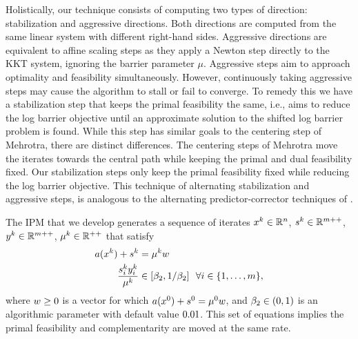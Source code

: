 \documentclass{article}
\begin{document}




Holistically, our technique consists of computing two types of direction: stabilization and aggressive directions. Both directions are computed from the same linear system with different right-hand sides. Aggressive directions are equivalent to affine scaling steps \cite{mehrotra1992implementation} as they apply a Newton step directly to the KKT system, ignoring the barrier parameter $\mu$. Aggressive steps aim to approach optimality and feasibility simultaneously. However, continuously taking aggressive steps may cause the algorithm to stall or fail to converge. To remedy this we have a stabilization step that keeps the primal feasibility the same, i.e., aims to reduce the log barrier objective until an approximate solution to the shifted log barrier problem is found. While this step has similar goals to the centering step of Mehrotra, there are distinct differences. The centering steps of Mehrotra move the iterates towards the central path while keeping the primal and dual feasibility fixed. Our stabilization steps only keep the primal feasibility fixed while reducing the log barrier objective. This technique of alternating stabilization and aggressive steps, is analogous to the alternating predictor-corrector techniques of \citet*[Algorithm~1]{mizuno1993adaptive}.



The IPM that we develop generates a sequence of iterates $x^{k} \in \mathbb{R}^{n}$, $s^k \in \mathbb{R}^{m++}$, $y^k \in \mathbb{R}^{m++}$, $\mu^k \in \mathbb{R}^{++}$ that satisfy
\begin{subequations}\label{eq:barrier-primal-sequence-nice}
\begin{flalign}
a(x^{k}) + s^{k} &= \mu^k w  \label{eq:primal-feasibility} \\
\frac{s^{k}_i y^{k}_i}{\mu^{k}} &\in [ \beta_{2}, 1 / \beta_{2}] ~~ \forall i \in \{ 1, \dots, m \},\label{eq:comp-slack} 
\end{flalign} 
\end{subequations}
where $w \ge 0$ is a vector for which $a(x^{0}) + s^{0} = \mu^0 w$, and $\beta_{2} \in (0,1)$ is an algorithmic parameter with default value $0.01$. This set of equations implies the primal feasibility and complementarity are moved at the same rate. 
\end{document}
